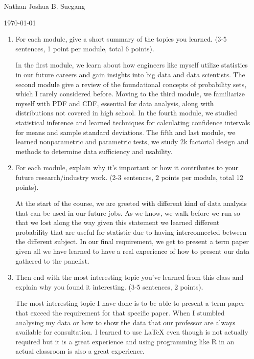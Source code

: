 \documentclass{article}
\begin{document}
Nathan Joshua B. Sucgang

\today

\begin{enumerate}
    \item For each module, give a short summary of the topics you learned. (3-5 sentences, 1 point per module, total 6 points).
    
    In the first module, we learn about how engineers like myself utilize statistics in our future careers and gain insights into big data and data scientists.
    The second module give a review of the foundational concepts of probability sets, which I rarely considered before. 
    Moving to the third module, we familiarize myself with PDF and CDF, essential for data analysis, along with distributions not covered in high school. 
    In the fourth module, we studied statistical inference and learned techniques for calculating confidence intervals for means and sample standard deviations.
    The fifth and last module, we learned nonparametric and parametric tests, we study 2k factorial design and methods to determine data sufficiency and usability.

    \item For each module, explain why it's important or how it contributes to your future research/industry work. (2-3 sentences, 2 points per module, total 12 points).
    
    At the start of the course, we are greeted with different kind of data analysis that can be used in our future jobs.  
    As we know, we walk before we run so that we lost along the way given this statement we learned different probability that are useful for statistic due to having interconnected between the different subject. 
    In our final requirement, we get to present a term paper given all we have learned to have a real experience of how to present our data gathered to the panelist.


    \item Then end with the most interesting topic you've learned from this class and explain why you found it interesting. (3-5 sentences, 2 points).
    
    The most interesting topic I have done is to be able to present a term paper that exceed the requirement for that specific paper.
    When I stumbled analysing my data or how to show the data that our professor are always available for consultation.
    I learned to use LaTeX even though is not actually required but it is a great experience and using programming like R in an actual classroom is also a great experience.
\end{enumerate} 
\end{document}
